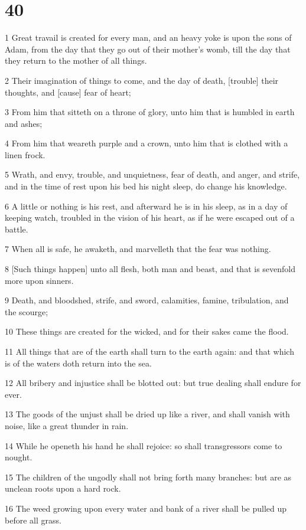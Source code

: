\chapter{40}

\par 1 Great travail is created for every man, and an heavy yoke is upon the sons of Adam, from the day that they go out of their mother's womb, till the day that they return to the mother of all things.
\par 2 Their imagination of things to come, and the day of death, [trouble] their thoughts, and [cause] fear of heart;
\par 3 From him that sitteth on a throne of glory, unto him that is humbled in earth and ashes;
\par 4 From him that weareth purple and a crown, unto him that is clothed with a linen frock.
\par 5 Wrath, and envy, trouble, and unquietness, fear of death, and anger, and strife, and in the time of rest upon his bed his night sleep, do change his knowledge.
\par 6 A little or nothing is his rest, and afterward he is in his sleep, as in a day of keeping watch, troubled in the vision of his heart, as if he were escaped out of a battle.
\par 7 When all is safe, he awaketh, and marvelleth that the fear was nothing.
\par 8 [Such things happen] unto all flesh, both man and beast, and that is sevenfold more upon sinners.
\par 9 Death, and bloodshed, strife, and sword, calamities, famine, tribulation, and the scourge;
\par 10 These things are created for the wicked, and for their sakes came the flood.
\par 11 All things that are of the earth shall turn to the earth again: and that which is of the waters doth return into the sea.
\par 12 All bribery and injustice shall be blotted out: but true dealing shall endure for ever.
\par 13 The goods of the unjust shall be dried up like a river, and shall vanish with noise, like a great thunder in rain.
\par 14 While he openeth his hand he shall rejoice: so shall transgressors come to nought.
\par 15 The children of the ungodly shall not bring forth many branches: but are as unclean roots upon a hard rock.
\par 16 The weed growing upon every water and bank of a river shall be pulled up before all grass.
